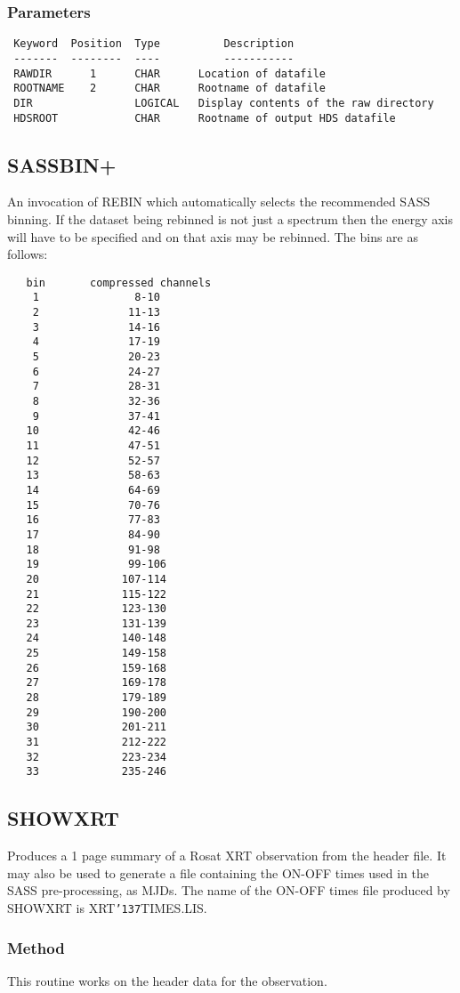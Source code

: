 \documentclass{book}
\renewcommand{\_}{{\tt\char'137}}     %
\begin{document}
\subsubsection{Parameters}
\begin{verbatim}
 Keyword  Position  Type          Description
 -------  --------  ----          -----------
 RAWDIR      1      CHAR      Location of datafile
 ROOTNAME    2      CHAR      Rootname of datafile
 DIR                LOGICAL   Display contents of the raw directory
 HDSROOT            CHAR      Rootname of output HDS datafile

\end{verbatim}\subsection{SASSBIN+}
An invocation of REBIN which automatically selects the recommended
SASS binning. If the dataset being rebinned is not just a spectrum
then the energy axis will have to be specified and on that axis may
be rebinned. The bins are as follows:
\begin{verbatim}
   bin       compressed channels
    1               8-10
    2              11-13
    3              14-16
    4              17-19
    5              20-23
    6              24-27
    7              28-31
    8              32-36
    9              37-41
   10              42-46
   11              47-51
   12              52-57
   13              58-63
   14              64-69
   15              70-76
   16              77-83
   17              84-90
   18              91-98
   19              99-106
   20             107-114
   21             115-122
   22             123-130
   23             131-139
   24             140-148
   25             149-158
   26             159-168
   27             169-178
   28             179-189
   29             190-200
   30             201-211
   31             212-222
   32             223-234
   33             235-246
\end{verbatim}
\subsection{SHOWXRT}
Produces a 1 page summary of a Rosat XRT observation from the
header file. It may also be used to generate a file containing the
ON-OFF times used in the SASS pre-processing, as MJDs. The
name of the ON-OFF times file produced by SHOWXRT is XRT\_TIMES.LIS.

\subsubsection{Method}
This routine works on the header data for the observation.
\end{document}

